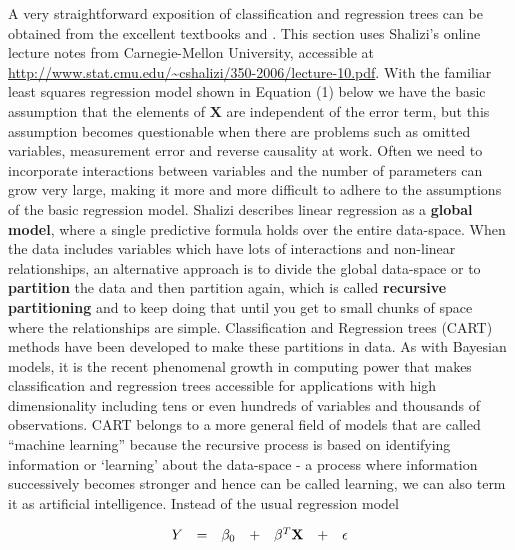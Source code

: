 \documentclass[alpha-refs,fleqn]{wiley-article_p2}
\begin{document}
A very straightforward exposition of classification and regression trees can be obtained from the excellent textbooks \cite{Hastie_2008} and \cite{Shalizi_2013}. This section uses Shalizi's online lecture notes from Carnegie-Mellon University, accessible at \url{http://www.stat.cmu.edu/~cshalizi/350-2006/lecture-10.pdf}. With the familiar least squares regression model shown in Equation (1) below we have the basic assumption that the elements of $\textbf{X}$ are independent of the error term, but this assumption becomes questionable when there are problems such as omitted variables, measurement error and reverse causality at work. Often we need to incorporate interactions between variables and the number of parameters can grow very large, making it more and more difficult to adhere to the assumptions of the basic regression model. Shalizi describes linear regression as a \textbf{global model}, where a single predictive formula holds over the entire data-space. When the data includes variables which have lots of interactions and non-linear relationships, an alternative approach is to divide the global data-space or to \textbf{partition} the data and then partition again, which is called \textbf{recursive partitioning} and to keep doing that until you get to small chunks of space where the relationships are simple. Classification and Regression trees (CART) methods  have been developed to make these partitions in data. As with Bayesian models, it is the recent phenomenal growth in computing power that makes classification and regression trees accessible for applications with high dimensionality including tens or even hundreds of variables and thousands of observations. CART belongs to a more general field of models that are called ``machine learning'' because the recursive process is based on identifying information or `learning' about the data-space - a process where information successively becomes stronger and hence can be called learning, we can also term it as artificial intelligence.  Instead of the usual regression model

\begin{equation} 
Y \hspace{1em} $=$ \hspace{1em} \beta_{0} \hspace{1em} $+$  \hspace{1em}  \beta^{T}\textbf{X} \hspace{1em} $+$ \hspace{1em} \epsilon
\end{equation}
\end{document}
